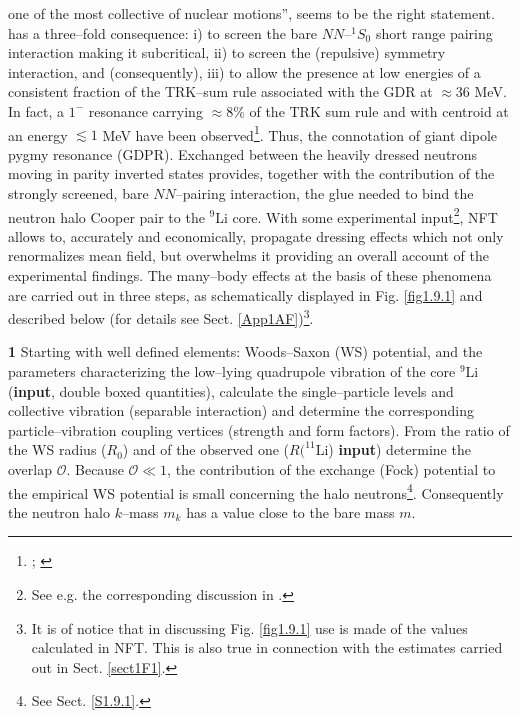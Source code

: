 { one of the most collective of nuclear  motions'', seems to be  the right statement.} has a three--fold consequence: i) to screen the bare $NN$--$^1S_0$ short  range pairing interaction making it subcritical, ii) to screen the (repulsive) symmetry interaction, and (consequently), iii) to allow the presence at low energies of a consistent fraction of the TRK--sum rule associated with the GDR at $\approx 36$ MeV. In fact, a $1^-$ resonance carrying $\approx 8\%$ of the TRK sum rule and with centroid at an energy $\lesssim 1$ MeV have been observed\footnote{\cite{Kanungo:15}; \cite{Sackett:93,Zinser:97}}. Thus, the connotation of giant dipole pygmy resonance (GDPR). Exchanged between the heavily dressed neutrons moving in  parity inverted states provides, together with the contribution of the strongly screened, bare $NN$--pairing interaction, the glue needed to bind the neutron halo Cooper pair to the $^9$Li core. With some experimental input\footnote{See e.g. the corresponding discussion in \cite{Barranco:17}.}, NFT allows to, accurately and economically, propagate dressing effects which not only renormalizes mean field, but overwhelms it providing an overall account of the experimental findings.
The many--body effects at the basis of these phenomena are carried out   in three steps, as schematically displayed in Fig. \ref{fig1.9.1} and described below (for details see Sect. \ref{App1AF})\footnote{It is of notice that in discussing Fig. \ref{fig1.9.1} use is made of the values calculated in NFT. This is also true in connection with the estimates carried out in Sect. \ref{sect1F1}.}.


\textbf{1} Starting with well defined elements: Woods--Saxon (WS) potential, and the parameters characterizing the low--lying quadrupole vibration of the core $^{9}$Li (\textbf{input}, double boxed quantities), calculate the single--particle levels and collective vibration (separable interaction) and determine the corresponding particle--vibration coupling vertices (strength and form factors). From the ratio of the WS radius ($R_0$) and of the observed one ($R(^{11}$Li) \textbf{input}) determine the overlap $\mathcal O$. Because $\mathcal O\ll 1$, the contribution of the exchange (Fock) potential to the empirical WS potential is small concerning the halo neutrons\footnote{See Sect. \ref{S1.9.1}.}. Consequently the neutron halo $k$--mass $m_k$ has a value close to the bare mass $m$.

